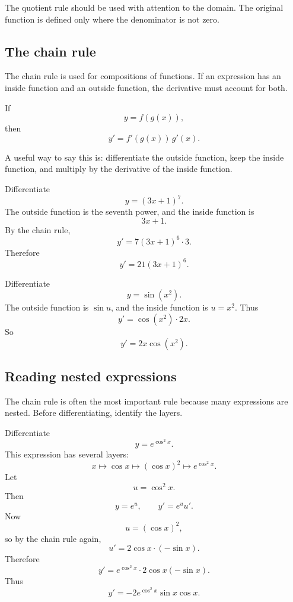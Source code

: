 The quotient rule should be used with attention to the domain. The original function is defined only where the denominator is not zero.

\subsection*{The chain rule}

The chain rule is used for compositions of functions. If an expression has an inside function and an outside function, the derivative must account for both.

\begin{theorembox}
If
\[
y=f(g(x)),
\]
then
\[
y'=f'(g(x))\,g'(x).
\]
\end{theorembox}

A useful way to say this is: differentiate the outside function, keep the inside function, and multiply by the derivative of the inside function.

\begin{examplebox}
Differentiate
\[
y=(3x+1)^7.
\]
The outside function is the seventh power, and the inside function is
\[
3x+1.
\]
By the chain rule,
\[
y'=7(3x+1)^6\cdot3.
\]
Therefore
\[
y'=21(3x+1)^6.
\]
\end{examplebox}

\begin{examplebox}
Differentiate
\[
y=\sin(x^2).
\]
The outside function is \(\sin u\), and the inside function is \(u=x^2\). Thus
\[
y'=\cos(x^2)\cdot 2x.
\]
So
\[
y'=2x\cos(x^2).
\]
\end{examplebox}

\subsection*{Reading nested expressions}

The chain rule is often the most important rule because many expressions are nested. Before differentiating, identify the layers.

\begin{examplebox}
Differentiate
\[
y=e^{\cos^2 x}.
\]
This expression has several layers:
\[
x \longmapsto \cos x \longmapsto (\cos x)^2 \longmapsto e^{\cos^2 x}.
\]
Let
\[
u=\cos^2 x.
\]
Then
\[
y=e^u,
\qquad
 y'=e^u u'.
\]
Now
\[
u=(\cos x)^2,
\]
so by the chain rule again,
\[
u'=2\cos x\cdot(-\sin x).
\]
Therefore
\[
y'=e^{\cos^2 x}\cdot 2\cos x(-\sin x).
\]
Thus
\[
y'=-2e^{\cos^2 x}\sin x\cos x.
\]
\end{examplebox}

